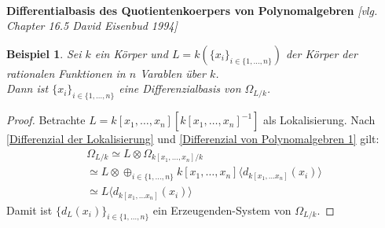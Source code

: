 \documentclass[10pt,a4paper]{report}
\newcommand{\comment}[1]{}
\newcommand{\ModulsOfDifferenzials}{David Eisenbud 1994}
\newcounter{Aussage}[chapter]
\newtheorem{bsp}[Aussage]{Beispiel}
\newcommand{\divR}[2]{\Omega_{#1/#2}}
\newcommand{\divf}[1]{d_{#1}}
\newcommand{\tensor}[3]{#1 \otimes #3}
\newcommand{\lok}[2]{#1 [#2^{-1}]}
\newcommand{\Verz}[1]{\langle #1 \rangle}
\begin{document}
\ \\
\textbf{Differentialbasis des Quotientenkoerpers von Polynomalgebren} \textit{[vlg. Chapter 16.5 \ModulsOfDifferenzials]}
\begin{bsp}\comment{\label{Differentialbasis des Quotientenkoerpers von Polynomalgebren}}
Sei $k$ ein Körper und $L = k(\lbrace x_i \rbrace_{i \in \lbrace 1,\dots,n \rbrace})$ der Körper der rationalen Funktionen in $n$ Varablen über $k$.\\
Dann ist $\lbrace x_i \rbrace_{i \in \lbrace 1,\dots,n \rbrace}$ eine Differenzialbasis von $\divR{L}{k}$.
\end{bsp}
\begin{proof}
Betrachte $L = \lok{k[x_1,\dots,x_n]}{k[x_1,\dots,x_n]}$ als Lokalisierung. Nach \cref{Differenzial der Lokalisierung} und \cref{Differenzial von Polynomalgebren 1} gilt:
\begin{gather*}
\divR{L}{k} \simeq \tensor{L}{k[x_1,\dots,x_n]}{\divR{k[x_1,\dots,x_n]}{k}} \\
\simeq \tensor{L}{k[x_1,\dots,x_n]}{\oplus_{i \in \lbrace 1,\dots,n \rbrace} k[x_1,\dots,x_n] \Verz{\divf{k[x_1,\dots x_n]}(x_i)}} \\
\simeq L \Verz{\divf{k[x_1,\dots x_n]}(x_i)}
\end{gather*}
Damit ist $\lbrace \divf{L}(x_i) \rbrace_{i \in \lbrace 1,\dots,n \rbrace}$ ein Erzeugenden-System von $\divR{L}{k}$.
\end{proof}
\end{document}
